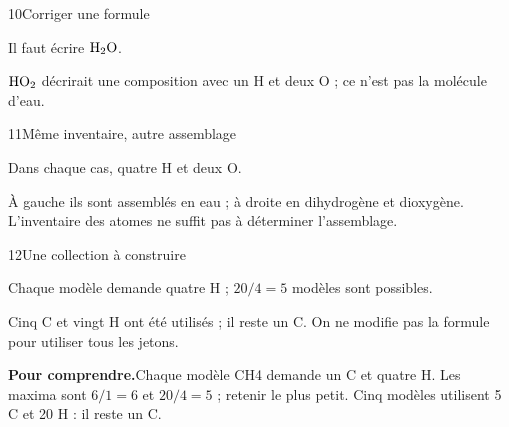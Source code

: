 \par\noindent\begin{minipage}{\linewidth}
\begin{corrige}{10}{Corriger une formule}
\begin{questions}
\item Il faut écrire $\ce{H2O}$.
\item $\ce{HO2}$ décrirait une composition avec un H et deux O ; ce n’est pas la molécule d’eau.
\end{questions}
\end{corrige}
\end{minipage}
\par\noindent\begin{minipage}{\linewidth}
\begin{corrige}{11}{Même inventaire, autre assemblage}
\begin{questions}
\item Dans chaque cas, quatre H et deux O.
\item À gauche ils sont assemblés en eau ; à droite en dihydrogène et dioxygène. L’inventaire des atomes ne suffit pas à déterminer l’assemblage.
\end{questions}
\end{corrige}
\end{minipage}
\par\noindent\begin{minipage}{\linewidth}
\begin{corrige}{12}{Une collection à construire}
\begin{questions}
\item Chaque modèle demande quatre H ; $20/4=5$ modèles sont possibles.
\item Cinq C et vingt H ont été utilisés ; il reste un C. On ne modifie pas la formule pour utiliser tous les jetons.
\end{questions}
\par\smallskip\noindent\textbf{Pour comprendre.}\enspace Chaque modèle CH4 demande un C et quatre H. Les maxima sont $6/1=6$ et $20/4=5$ ; retenir le plus petit. Cinq modèles utilisent 5 C et 20 H : il reste un C.\par
{}
\end{corrige}
\end{minipage}
